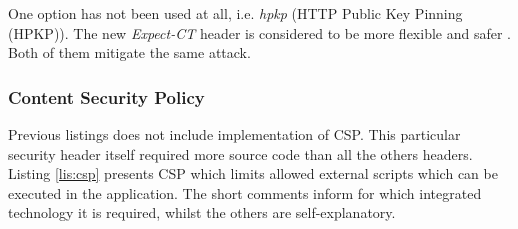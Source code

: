 \documentclass{article} %
\begin{document}
One option has not been used at all, i.e. \textit{hpkp} (HTTP Public Key Pinning (HPKP)). The new \textit{Expect-CT} header is considered to be more flexible and safer \cite{bib:expect-ct}. Both of them mitigate the same attack.
\subsubsection{Content Security Policy}
Previous listings does not include implementation of CSP. This particular security header itself required more source code than all the others headers. Listing \ref{lis:csp} presents CSP which limits allowed external scripts which can be executed in the application. The short comments inform for which integrated technology it is required, whilst the others are self-explanatory.
\end{document}
